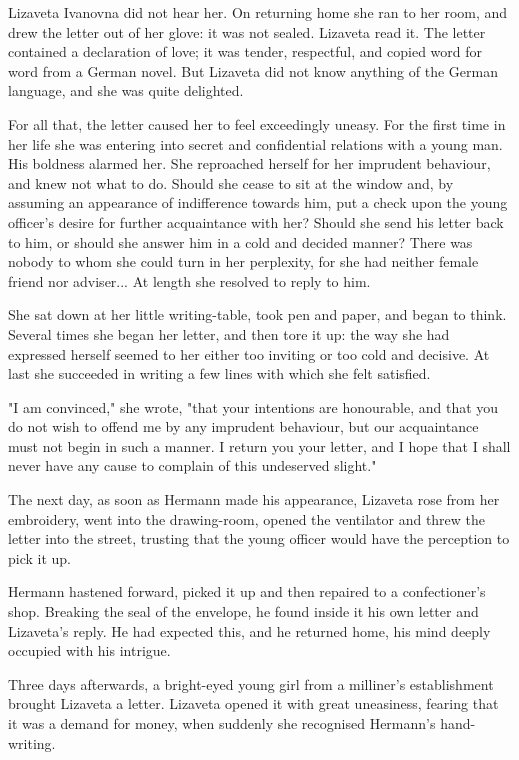 Lizaveta Ivanovna did not hear her. On returning home she ran to her
room, and drew the letter out of her glove: it was not sealed.
Lizaveta read it. The letter contained a declaration of love; it was
tender, respectful, and copied word for word from a German novel. But
Lizaveta did not know anything of the German language, and she was
quite delighted.

For all that, the letter caused her to feel exceedingly uneasy. For
the first time in her life she was entering into secret and
confidential relations with a young man. His boldness alarmed her. She
reproached herself for her imprudent behaviour, and knew not what to
do. Should she cease to sit at the window and, by assuming an
appearance of indifference towards him, put a check upon the young
officer's desire for further acquaintance with her? Should she send
his letter back to him, or should she answer him in a cold and decided
manner? There was nobody to whom she could turn in her perplexity, for
she had neither female friend nor adviser... At length she resolved to
reply to him.

She sat down at her little writing-table, took pen and paper, and
began to think. Several times she began her letter, and then tore it
up: the way she had expressed herself seemed to her either too
inviting or too cold and decisive. At last she succeeded in writing a
few lines with which she felt satisfied.

"I am convinced," she wrote, "that your intentions are honourable, and
that you do not wish to offend me by any imprudent behaviour, but our
acquaintance must not begin in such a manner. I return you your
letter, and I hope that I shall never have any cause to complain of
this undeserved slight."

The next day, as soon as Hermann made his appearance, Lizaveta rose
from her embroidery, went into the drawing-room, opened the ventilator
and threw the letter into the street, trusting that the young officer
would have the perception to pick it up.

Hermann hastened forward, picked it up and then repaired to a
confectioner's shop. Breaking the seal of the envelope, he found
inside it his own letter and Lizaveta's reply. He had expected this,
and he returned home, his mind deeply occupied with his intrigue.

Three days afterwards, a bright-eyed young girl from a milliner's
establishment brought Lizaveta a letter. Lizaveta opened it with great
uneasiness, fearing that it was a demand for money, when suddenly she
recognised Hermann's hand-writing.

